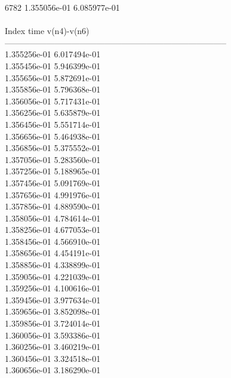 6782	1.355056e-01	6.085977e-01	\\ \hline
\\ \hline
Index   time            v(n4)-v(n6)     \\ \hline
--------------------------------------------------------------------------------\\ 	1.355256e-01	6.017494e-01	\\ 	1.355456e-01	5.946399e-01	\\ 	1.355656e-01	5.872691e-01	\\ 	1.355856e-01	5.796368e-01	\\ 	1.356056e-01	5.717431e-01	\\ 	1.356256e-01	5.635879e-01	\\ 	1.356456e-01	5.551714e-01	\\ 	1.356656e-01	5.464938e-01	\\ 	1.356856e-01	5.375552e-01	\\ 	1.357056e-01	5.283560e-01	\\ 	1.357256e-01	5.188965e-01	\\ 	1.357456e-01	5.091769e-01	\\ 	1.357656e-01	4.991976e-01	\\ 	1.357856e-01	4.889590e-01	\\ 	1.358056e-01	4.784614e-01	\\ 	1.358256e-01	4.677053e-01	\\ 	1.358456e-01	4.566910e-01	\\ 	1.358656e-01	4.454191e-01	\\ 	1.358856e-01	4.338899e-01	\\ 	1.359056e-01	4.221039e-01	\\ 	1.359256e-01	4.100616e-01	\\ 	1.359456e-01	3.977634e-01	\\ 	1.359656e-01	3.852098e-01	\\ 	1.359856e-01	3.724014e-01	\\ 	1.360056e-01	3.593386e-01	\\ 	1.360256e-01	3.460219e-01	\\ 	1.360456e-01	3.324518e-01	\\ 	1.360656e-01	3.186290e-01	\\ \hline
